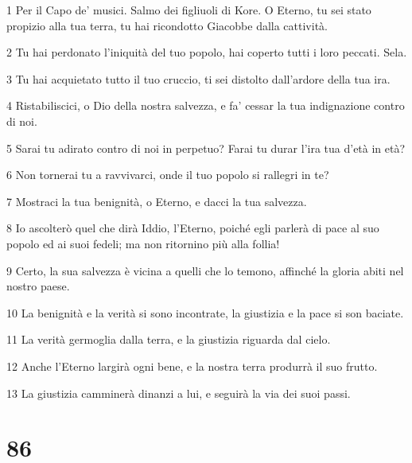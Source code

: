 \par 1 Per il Capo de' musici. Salmo dei figliuoli di Kore. O Eterno, tu sei stato propizio alla tua terra, tu hai ricondotto Giacobbe dalla cattività.
\par 2 Tu hai perdonato l'iniquità del tuo popolo, hai coperto tutti i loro peccati. Sela.
\par 3 Tu hai acquietato tutto il tuo cruccio, ti sei distolto dall'ardore della tua ira.
\par 4 Ristabiliscici, o Dio della nostra salvezza, e fa' cessar la tua indignazione contro di noi.
\par 5 Sarai tu adirato contro di noi in perpetuo? Farai tu durar l'ira tua d'età in età?
\par 6 Non tornerai tu a ravvivarci, onde il tuo popolo si rallegri in te?
\par 7 Mostraci la tua benignità, o Eterno, e dacci la tua salvezza.
\par 8 Io ascolterò quel che dirà Iddio, l'Eterno, poiché egli parlerà di pace al suo popolo ed ai suoi fedeli; ma non ritornino più alla follia!
\par 9 Certo, la sua salvezza è vicina a quelli che lo temono, affinché la gloria abiti nel nostro paese.
\par 10 La benignità e la verità si sono incontrate, la giustizia e la pace si son baciate.
\par 11 La verità germoglia dalla terra, e la giustizia riguarda dal cielo.
\par 12 Anche l'Eterno largirà ogni bene, e la nostra terra produrrà il suo frutto.
\par 13 La giustizia camminerà dinanzi a lui, e seguirà la via dei suoi passi.

\chapter{86}


